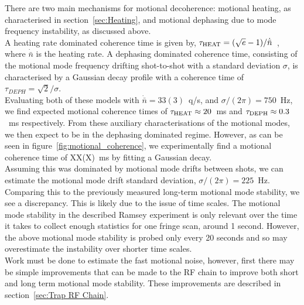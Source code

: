     There are two main mechanisms for motional decoherence: motional heating, as
    characterised in section~\ref{sec:Heating}, and motional dephasing due to
    mode frequency instability, as discussed above. \\
    A heating rate dominated coherence time is given by, $\tau_{\rm HEAT} =
    (\sqrt{e}-1)/\dot{\bar{n}}$~\cite{XXX}, where $\dot{\bar{n}}$ is the heating
    rate. A dephasing dominated coherence time, consisting of the
    motional mode frequency drifting shot-to-shot with a standard deviation
    $\sigma$, is characterised by a Gaussian decay profile with a coherence time
    of $\tau_{DEPH} = \sqrt{2}/\sigma$.\\
    Evaluating both of these models with $\dot{\bar{n}}=33(3)$~q/s, and
    $\sigma/(2\pi) = 750$~Hz, we find expected motional coherence times of $\tau_{\rm
    HEAT} \approx 20$~ms and $\tau_{\rm DEPH} \approx 0.3$~ms respectively. From these auxiliary characterisations of the motional modes, we then
    expect to be in the dephasing dominated regime.  However, as can be
    seen in figure~\ref{fig:motional_coherence}, we experimentally find a
    motional coherence time of XX(X)~ms by fitting a Gaussian decay. \\
    Assuming this was dominated by motional mode drifts between shots, we can
    estimate the motional mode drift standard deviation, $\sigma/(2\pi) =
    225$~Hz. Comparing this to the previously measured long-term motional mode
    stability, we see a discrepancy. This is likely due to the issue of time
    scales. The motional mode stability in the described Ramsey experiment is
    only relevant over the time it takes to collect enough statistics for one
    fringe scan, around 1 second. However, the above motional mode stability is
    probed only every 20 seconds and so may overestimate the instability over
    shorter time scales.\\ Work must be done to estimate the fast motional
    noise, however, first there may be simple improvements that can be made to
    the RF chain to improve both short and long term motional mode stability.
    These improvements are described in section~\ref{sec:Trap RF Chain}.\\


